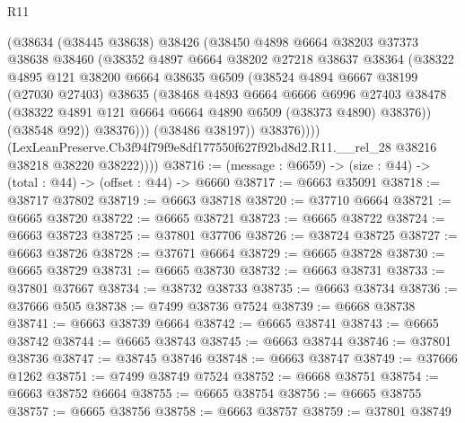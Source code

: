 \begin{lexlean}{R11}
\begin{coremodule}
                  (@38634
                    (@38445 @38638)
                    @38426
                    (@38450
                      @4898
                      @6664
                      @38203
                      @37373
                      @38638
                      @38460
                      (@38352
                        @4897
                        @6664
                        @38202
                        @27218
                        @38637
                        @38364
                        (@38322
                          @4895
                          @121
                          @38200
                          @6664
                          @38635
                          @6509
                          (@38524
                            @4894
                            @6667
                            @38199
                            (@27030 @27403)
                            @38635
                            (@38468
                              @4893
                              @6664
                              @6666
                              @6996
                              @27403
                              @38478
                              (@38322 @4891 @121 @6664 @6664 @4890 @6509 (@38373 @4890) @38376))
                            (@38548 @92))
                          @38376)))
                    (@38486 @38197))
                  @38376))))
          (LexLeanPreserve.Cb3f94f79f9e8df177550f627f92bd8d2.R11.__rel_28
            @38216
            @38218
            @38220
            @38222))))
@38716 := (message : @6659) -> (size : @44) -> (total : @44) -> (offset : @44) -> @6660
@38717 := @6663 @35091
@38718 := @38717 @37802
@38719 := @6663 @38718
@38720 := @37710 @6664
@38721 := @6665 @38720
@38722 := @6665 @38721
@38723 := @6665 @38722
@38724 := @6663 @38723
@38725 := @37801 @37706
@38726 := @38724 @38725
@38727 := @6663 @38726
@38728 := @37671 @6664
@38729 := @6665 @38728
@38730 := @6665 @38729
@38731 := @6665 @38730
@38732 := @6663 @38731
@38733 := @37801 @37667
@38734 := @38732 @38733
@38735 := @6663 @38734
@38736 := @37666 @505
@38738 := @7499 @38736 @7524
@38739 := @6668 @38738
@38741 := @6663 @38739 @6664
@38742 := @6665 @38741
@38743 := @6665 @38742
@38744 := @6665 @38743
@38745 := @6663 @38744
@38746 := @37801 @38736
@38747 := @38745 @38746
@38748 := @6663 @38747
@38749 := @37666 @1262
@38751 := @7499 @38749 @7524
@38752 := @6668 @38751
@38754 := @6663 @38752 @6664
@38755 := @6665 @38754
@38756 := @6665 @38755
@38757 := @6665 @38756
@38758 := @6663 @38757
@38759 := @37801 @38749

\end{coremodule}
\end{lexlean}
